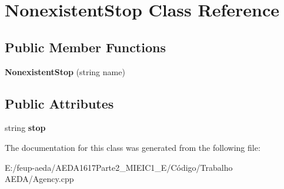 \hypertarget{class_nonexistent_stop}{}\section{Nonexistent\+Stop Class Reference}
\label{class_nonexistent_stop}
\subsection*{Public Member Functions}
\begin{DoxyCompactItemize}
\item 
\mbox{\label{class_nonexistent_stop_a68e23a1955374c63909d5c8abd80585a}} 
{\bfseries Nonexistent\+Stop} (string name)
\end{DoxyCompactItemize}
\subsection*{Public Attributes}
\begin{DoxyCompactItemize}
\item 
\mbox{\label{class_nonexistent_stop_a3083f3480d02646b96e3291fedaf9615}} 
string {\bfseries stop}
\end{DoxyCompactItemize}


The documentation for this class was generated from the following file\+:\begin{DoxyCompactItemize}
\item 
E\+:/feup-\/aeda/\+A\+E\+D\+A1617\+Parte2\+\_\+M\+I\+E\+I\+C1\+\_\+\+E/\+Código/\+Trabalho A\+E\+D\+A/Agency.\+cpp\end{DoxyCompactItemize}
